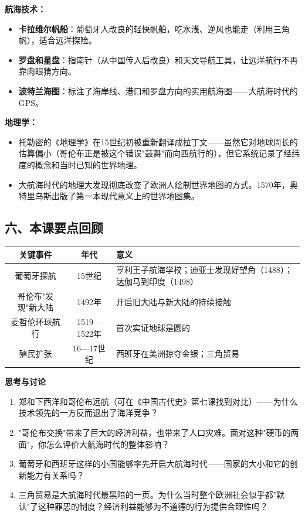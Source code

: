 \documentclass[a4paper,12pt]{ctexart}
\begin{document}
\textbf{航海技术：}
\begin{itemize}
  \item \textbf{卡拉维尔帆船}：葡萄牙人改良的轻快帆船，吃水浅、逆风也能走（利用三角帆），适合远洋探险。
  \item \textbf{罗盘和星盘}：指南针（从中国传入后改良）和天文导航工具，让远洋航行不再靠肉眼猜方向。
  \item \textbf{波特兰海图}：标注了海岸线、港口和罗盘方向的实用航海图——大航海时代的GPS。
\end{itemize}

\textbf{地理学：}
\begin{itemize}
  \item 托勒密的《地理学》在15世纪初被重新翻译成拉丁文——虽然它对地球周长的估算偏小（哥伦布正是被这个错误"鼓舞"而向西航行的），但它系统记录了经纬度的概念和当时已知的世界地理。
  \item 大航海时代的地理大发现彻底改变了欧洲人绘制世界地图的方式。1570年，奥特里乌斯出版了第一本现代意义上的世界地图集。
\end{itemize}

\subsection*{六、本课要点回顾}

\begin{center}
\begin{tabular}{|c|c|p{7cm}|}
\hline
\textbf{关键事件} & \textbf{年代} & \textbf{意义} \\
\hline
葡萄牙探航 & 15世纪 & 亨利王子航海学校；迪亚士发现好望角（1488）；达伽马到印度（1498） \\
\hline
哥伦布"发现"新大陆 & 1492年 & 开启旧大陆与新大陆的持续接触 \\
\hline
麦哲伦环球航行 & 1519—1522年 & 首次实证地球是圆的 \\
\hline
殖民扩张 & 16—17世纪 & 西班牙在美洲掠夺金银；三角贸易 \\
\hline
\end{tabular}
\end{center}

\vspace{0.3cm}
{\large\textcolor{orange!80!black}{\textbf{思考与讨论}}}
\begin{enumerate}
  \item 郑和下西洋和哥伦布远航（可在《中国古代史》第七课找到对比）——为什么技术领先的一方反而退出了海洋竞争？
  \item "哥伦布交换"带来了巨大的经济利益，也带来了人口灾难。面对这种"硬币的两面"，你怎么评价大航海时代的整体影响？
  \item 葡萄牙和西班牙这样的小国能够率先开启大航海时代——国家的大小和它的创新能力有关系吗？
  \item 三角贸易是大航海时代最黑暗的一页。为什么当时整个欧洲社会似乎都"默认"了这种罪恶的制度？经济利益能够为不道德的行为提供合理性吗？
\end{enumerate}
\end{document}
